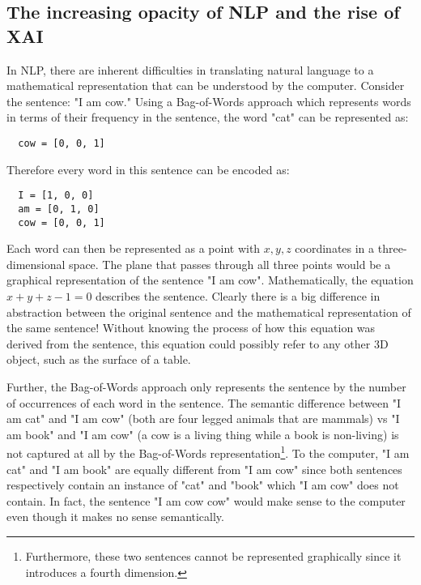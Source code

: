 \subsection{The increasing opacity of NLP and the rise of XAI}
\label{chap1:increasing_opacity}
In NLP, there are inherent difficulties in translating natural language to a mathematical representation that can be understood by the computer. Consider the sentence: "I am cow." Using a Bag-of-Words approach which represents words in terms of their frequency in the sentence, the word "cat" can be represented as:

\begin{lstlisting}
  cow = [0, 0, 1]
\end{lstlisting}

Therefore every word in this sentence can be encoded as: 

\begin{lstlisting}
  I = [1, 0, 0]
  am = [0, 1, 0]
  cow = [0, 0, 1]
\end{lstlisting}

Each word can then be represented as a point with $x, y, z$ coordinates in a three-dimensional space. The plane that passes through all three points would be a graphical representation of the sentence "I am cow". Mathematically, the equation $x + y + z - 1 = 0$ describes the sentence. Clearly there is a big difference in abstraction between the original sentence and the mathematical representation of the same sentence! Without knowing the process of how this equation was derived from the sentence, this equation could possibly refer to any other 3D object, such as the surface of a table.

Further, the Bag-of-Words approach only represents the sentence by the number of occurrences of each word in the sentence. The semantic difference between "I am cat" and "I am cow" (both are four legged animals that are mammals) vs "I am book" and "I am cow" (a cow is a living thing while a book is non-living) is not captured at all by the Bag-of-Words representation\footnote{Furthermore, these two sentences cannot be represented graphically since it introduces a fourth dimension.}. To the computer, "I am cat" and "I am book" are equally different from "I am cow" since both sentences respectively contain an instance of "cat" and "book" which "I am cow" does not contain. In fact, the sentence "I am cow cow" would make sense to the computer even though it makes no sense semantically.

